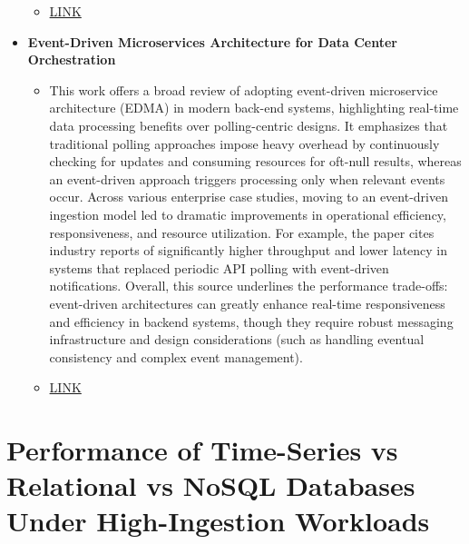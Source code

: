 \documentclass[11pt]{article}
\begin{document}
\begin{itemize}
\begin{itemize}
      \item[] \href{https://www.sciencedirect.com/science/article/pii/S0167739X23003977}{LINK}
  \end{itemize}
  \item[] \textbf{Event-Driven Microservices Architecture for Data Center Orchestration}
  \begin{itemize}
      \item[] This work offers a broad review of adopting event-driven microservice architecture (EDMA) in modern back-end systems, highlighting real-time data processing benefits over polling-centric designs. It emphasizes that traditional polling approaches impose heavy overhead by continuously checking for updates and consuming resources for oft-null results, whereas an event-driven approach triggers processing only when relevant events occur. Across various enterprise case studies, moving to an event-driven ingestion model led to dramatic improvements in operational efficiency, responsiveness, and resource utilization. For example, the paper cites industry reports of significantly higher throughput and lower latency in systems that replaced periodic API polling with event-driven notifications. Overall, this source underlines the performance trade-offs: event-driven architectures can greatly enhance real-time responsiveness and efficiency in backend systems, though they require robust messaging infrastructure and design considerations (such as handling eventual consistency and complex event management). 
      \item[] \href{https://www.ijsat.org/research-paper.php?id=3113}{LINK}
  \end{itemize}
\end{itemize}

\section*{Performance of Time-Series vs Relational vs NoSQL Databases Under High-Ingestion Workloads}
\end{document}
